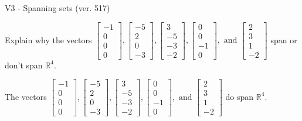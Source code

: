 \begin{exercise}
  \begin{exerciseTitle}V3 - Spanning sets (ver. 517)\end{exerciseTitle}
  \begin{exerciseStatement}
    Explain why the vectors \(\left[\begin{array}{r}
-1 \\
0 \\
0 \\
0
\end{array}\right] , \left[\begin{array}{r}
-5 \\
2 \\
0 \\
-3
\end{array}\right] , \left[\begin{array}{r}
3 \\
-5 \\
-3 \\
-2
\end{array}\right] , \left[\begin{array}{r}
0 \\
0 \\
-1 \\
0
\end{array}\right] , \text{ and } \left[\begin{array}{r}
2 \\
3 \\
1 \\
-2
\end{array}\right]\) span or don't span \(\mathbb{R}^4\). 
	


  \end{exerciseStatement}
  \begin{exerciseAnswer}
   The vectors \(\left[\begin{array}{r}
-1 \\
0 \\
0 \\
0
\end{array}\right] , \left[\begin{array}{r}
-5 \\
2 \\
0 \\
-3
\end{array}\right] , \left[\begin{array}{r}
3 \\
-5 \\
-3 \\
-2
\end{array}\right] , \left[\begin{array}{r}
0 \\
0 \\
-1 \\
0
\end{array}\right] , \text{ and } \left[\begin{array}{r}
2 \\
3 \\
1 \\
-2
\end{array}\right]\) 
  	 do  
	span \(\mathbb{R}^4\).
  



\end{exerciseAnswer}
\end{exercise}
